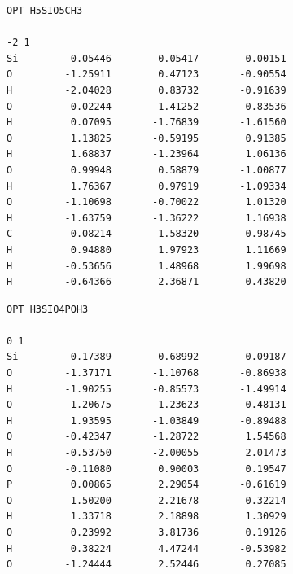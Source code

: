 \documentclass[
  printed, %
  table,   %
  lof,     %
  lot,     %
  oneside,
]{fithesis3}
\begin{document}
\begin{lstlisting}[frame=single, caption={\ce{H5SiO5CH3}},label=DescriptiveLabel]
OPT H5SIO5CH3

-2 1
Si        -0.05446       -0.05417        0.00151
O         -1.25911        0.47123       -0.90554
H         -2.04028        0.83732       -0.91639
O         -0.02244       -1.41252       -0.83536
H          0.07095       -1.76839       -1.61560
O          1.13825       -0.59195        0.91385
H          1.68837       -1.23964        1.06136
O          0.99948        0.58879       -1.00877
H          1.76367        0.97919       -1.09334
O         -1.10698       -0.70022        1.01320
H         -1.63759       -1.36222        1.16938
C         -0.08214        1.58320        0.98745
H          0.94880        1.97923        1.11669
H         -0.53656        1.48968        1.99698
H         -0.64366        2.36871        0.43820

 \end{lstlisting}
 \newpage
 

\begin{lstlisting}[frame=single, caption={\ce{H3SiO4(H2PO3)}},label=DescriptiveLabel]
OPT H3SIO4POH3

0 1
Si        -0.17389       -0.68992        0.09187
O         -1.37171       -1.10768       -0.86938
H         -1.90255       -0.85573       -1.49914
O          1.20675       -1.23623       -0.48131
H          1.93595       -1.03849       -0.89488
O         -0.42347       -1.28722        1.54568
H         -0.53750       -2.00055        2.01473
O         -0.11080        0.90003        0.19547
P          0.00865        2.29054       -0.61619
O          1.50200        2.21678        0.32214
H          1.33718        2.18898        1.30929
O          0.23992        3.81736        0.19126
H          0.38224        4.47244       -0.53982
O         -1.24444        2.52446        0.27085
 \end{lstlisting}

\newpage
\end{document}
